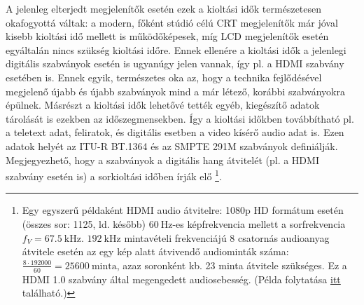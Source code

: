 
A jelenleg elterjedt megjelenítők esetén ezek a kioltási idők természetesen okafogyottá váltak:
a modern, főként stúdió célú CRT megjelenítők már jóval kisebb kioltási idő mellett is működőképesek, míg LCD megjelenítők esetén egyáltalán nincs szükség kioltási időre.
Ennek ellenére a kioltási idők a jelenlegi digitális szabványok esetén is ugyanúgy jelen vannak, így pl. a HDMI szabvány esetében is.
Ennek egyik, természetes oka az, hogy a technika fejlődésével megjelenő újabb és újabb szabványok mind a már létező, korábbi szabványokra épülnek.
Másrészt a kioltási idők lehetővé tették egyéb, kiegészítő adatok tárolását is ezekben az időszegmensekben.
Így a kioltási időkben továbbítható pl. a teletext adat, feliratok, és digitális esetben a video kísérő audio adat is.
Ezen adatok helyét az ITU-R BT.1364 és az SMPTE 291M szabványok definiálják. 
Megjegyezhető, hogy a szabványok a digitális hang átvitelét (pl. a HDMI szabvány esetén is) a sorkioltási időben írják elő \footnote{
Egy egyszerű példaként HDMI audio átvitelre:
1080p HD formátum esetén (összes sor: 1125, ld. később) $60~\mathrm{Hz}$-es képfrekvencia mellett a sorfrekvencia $f_V = 67.5~\mathrm{kHz}$.
$192~\mathrm{kHz}$ mintavételi frekvenciájú 8 csatornás audioanyag átvitele esetén az egy kép alatt átvivendő audiominták száma: $\frac{8 \cdot 192 000 }{60} = 25600~\mathrm{minta}$, azaz soronként kb. 23 minta átvitele szükséges.
Ez a HDMI 1.0 szabvány által megengedett audiosebesség. (Példa folytatása \href{https://www.sciencedirect.com/science/article/pii/B9780128016305000049}{itt} található.)
}.


